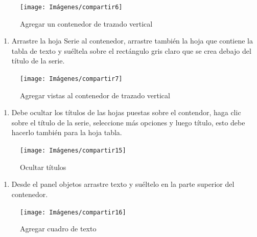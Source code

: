 \documentclass[
]{book}
\providecommand{\tightlist}{%
  \setlength{\itemsep}{0pt}\setlength{\parskip}{0pt}}
\begin{document}
\begin{figure}

{\centering \texttt{[image: Imágenes/compartir6]} 

}

\caption{Agregar un contenedor de trazado vertical}\label{fig:paso8tablero-fig}
\end{figure}

\begin{enumerate}
\def\labelenumi{\arabic{enumi}.}
\setcounter{enumi}{8}
\tightlist
\item
  Arrastre la hoja Serie al contenedor, arrastre también la hoja que contiene la tabla de texto y suéltela sobre el rectángulo gris claro que se crea debajo del título de la serie.
\end{enumerate}

\begin{figure}

{\centering \texttt{[image: Imágenes/compartir7]} 

}

\caption{Agregar vistas al contenedor de trazado vertical}\label{fig:paso9tablero-fig}
\end{figure}

\begin{enumerate}
\def\labelenumi{\arabic{enumi}.}
\setcounter{enumi}{9}
\tightlist
\item
  Debe ocultar los títulos de las hojas puestas sobre el contendor, haga clic sobre el título de la serie, seleccione más opciones y luego título, esto debe hacerlo también para la hoja tabla.
\end{enumerate}

\begin{figure}

{\centering \texttt{[image: Imágenes/compartir15]} 

}

\caption{Ocultar títulos}\label{fig:paso10tablero-fig}
\end{figure}

\begin{enumerate}
\def\labelenumi{\arabic{enumi}.}
\setcounter{enumi}{10}
\tightlist
\item
  Desde el panel objetos arrastre texto y suéltelo en la parte superior del contenedor.
\end{enumerate}

\begin{figure}

{\centering \texttt{[image: Imágenes/compartir16]} 

}

\caption{Agregar cuadro de texto}\label{fig:paso11tablero-fig}
\end{figure}
\end{document}

